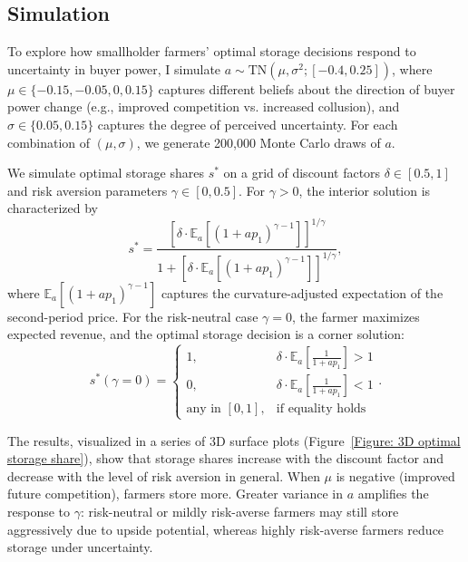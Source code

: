 \documentclass[12pt]{article}
\begin{document}
\subsection{Simulation}

To explore how smallholder farmers' optimal storage decisions respond to uncertainty in buyer power, I simulate $a \sim \mathrm{TN}(\mu, \sigma^2; [-0.4, 0.25])$, where $\mu \in \{-0.15, -0.05, 0, 0.15\}$ captures different beliefs about the direction of buyer power change (e.g., improved competition vs. increased collusion), and $\sigma \in \{0.05, 0.15\}$ captures the degree of perceived uncertainty. For each combination of $(\mu, \sigma)$, we generate 200{,}000 Monte Carlo draws of $a$.

We simulate optimal storage shares $s^*$ on a grid of discount factors $\delta \in [0.5, 1]$ and risk aversion parameters $\gamma \in [0, 0.5]$. For $\gamma > 0$, the interior solution is characterized by
\[
s^* = \frac{\left[\delta \cdot \mathbb{E}_a[(1 + a p_1)^{\gamma - 1}]\right]^{1/\gamma}}{1 + \left[\delta \cdot \mathbb{E}_a[(1 + a p_1)^{\gamma - 1}]\right]^{1/\gamma}},
\]
where $\mathbb{E}_a[(1 + a p_1)^{\gamma - 1}]$ captures the curvature-adjusted expectation of the second-period price. For the risk-neutral case $\gamma = 0$, the farmer maximizes expected revenue, and the optimal storage decision is a corner solution:
\[
s^*(\gamma = 0) = 
\begin{cases}
1, & \delta \cdot \mathbb{E}_a\left[\frac{1}{1 + a p_1}\right] > 1 \\
0, & \delta \cdot \mathbb{E}_a\left[\frac{1}{1 + a p_1}\right] < 1 \\
\text{any in } [0,1], & \text{if equality holds}
\end{cases}.
\]

The results, visualized in a series of $3$D surface plots (Figure~\ref{Figure: 3D optimal storage share}), show that storage shares increase with the discount factor and decrease with the level of risk aversion in general. When $\mu$ is negative (improved future competition), farmers store more. Greater variance in $a$ amplifies the response to $\gamma$: risk-neutral or mildly risk-averse farmers may still store aggressively due to upside potential, whereas highly risk-averse farmers reduce storage under uncertainty.
\end{document}
